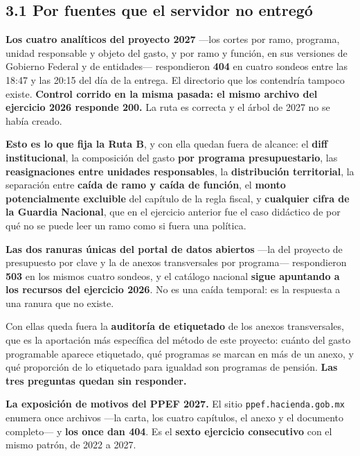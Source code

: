 \subsection*{3.1 Por fuentes que el servidor no entregó}

\begin{list}{}{\setlength{\leftmargin}{1.4em}\setlength{\itemsep}{4pt}}
\item[$\bullet$] \textbf{Los cuatro analíticos del proyecto 2027} ---los cortes por ramo,
programa, unidad responsable y objeto del gasto, y por ramo y función, en sus versiones de
Gobierno Federal y de entidades--- respondieron \textbf{404} en cuatro sondeos entre las 18:47 y las 20:15 del día
de la entrega. El directorio que los contendría tampoco existe. \textbf{Control corrido en la
misma pasada: el mismo archivo del ejercicio 2026 responde 200.} La ruta es correcta y el
árbol de 2027 no se había creado.

\textbf{Esto es lo que fija la Ruta B}, y con ella quedan fuera de alcance: el \textbf{diff
institucional}, la composición del gasto \textbf{por programa presupuestario}, las
\textbf{reasignaciones entre unidades responsables}, la \textbf{distribución territorial},
la separación entre \textbf{caída de ramo y caída de función}, el \textbf{monto
potencialmente excluible} del capítulo de la regla fiscal, y \textbf{cualquier cifra de la
Guardia Nacional}, que en el ejercicio anterior fue el caso didáctico de por qué no se puede
leer un ramo como si fuera una política.

\item[$\bullet$] \textbf{Las dos ranuras únicas del portal de datos abiertos} ---la del
proyecto de presupuesto por clave y la de anexos transversales por programa--- respondieron
\textbf{503} en los mismos cuatro sondeos, y el catálogo nacional \textbf{sigue apuntando a
los recursos del ejercicio 2026}. No es una caída temporal: es la respuesta a una ranura que no existe.

Con ellas queda fuera la \textbf{auditoría de etiquetado} de los anexos transversales, que
es la aportación más específica del método de este proyecto: cuánto del gasto programable
aparece etiquetado, qué programas se marcan en más de un anexo, y qué proporción de lo
etiquetado para igualdad son programas de pensión. \textbf{Las tres preguntas quedan sin responder.}

\item[$\bullet$] \textbf{La exposición de motivos del PPEF 2027.} El sitio
\texttt{ppef.hacienda.gob.mx} enumera once archivos ---la carta, los cuatro capítulos, el
anexo y el documento completo--- y \textbf{los once dan 404}. Es el \textbf{sexto ejercicio
consecutivo} con el mismo patrón, de 2022 a 2027.


\end{list}
